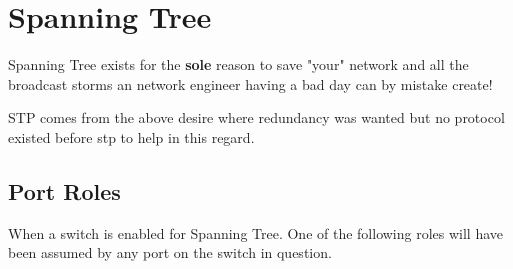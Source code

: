 
\section{Spanning Tree}

Spanning Tree exists for the \textbf{sole} reason to save "your" network and all the broadcast storms an network engineer having a bad day can by mistake create!

STP comes from the above desire where redundancy was wanted but no protocol existed before \gls{stp} to help in this regard.

\begin{table}[h]
    \centering
    \caption{Spanning Tree standards}
    \label{stpstandards}
\end{table}

\subsection{Port Roles}

When a switch is enabled for Spanning Tree. One of the following roles will have been assumed by any port on the switch in question.

